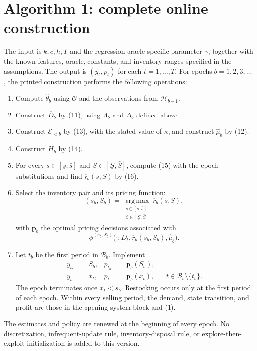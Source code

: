 \documentclass[11pt]{article}
\begin{document}
\section*{Algorithm 1: complete online construction}
The input is \(k,c,h,T\) and the regression-oracle-specific parameter \(\gamma\), together with the known features, oracle, constants, and inventory ranges specified in the assumptions. The output is \((y_t,p_t)\) for each \(t=1,\ldots,T\). For epochs \(b=1,2,3,\ldots\), the printed construction performs the following operations:
\begin{enumerate}
\item Compute \(\widehat\theta_b\) using \(\mathcal O\) and the observations from \(\mathcal H_{b-1}\).
\item Construct \(\overline D_b\) by (11), using \(\Lambda_b\) and \(\Delta_b\) defined above.
\item Construct \(\mathcal E_{<b}\) by (13), with the stated value of \(\kappa\), and construct \(\widehat\mu_b\) by (12).
\item Construct \(\overline H_b\) by (14).
\item For every \(s\in[\underline s,\bar s]\) and \(S\in[\underline S,\bar S]\), compute (15) with the epoch substitutions and find \(\overline r_b(s,S)\) by (16).
\item Select the inventory pair and its pricing function:
\[
(s_b,S_b)=
\operatorname*{arg\,max}_{\substack{s\in[\underline s,\bar s]\\S\in[\underline S,\bar S]}}
\overline r_b(s,S),
\]
with \(\boldsymbol p_b\) the optimal pricing decisions associated with
\[
\phi^{(s_b,S_b)}
\bigl(\cdot;\overline D_b,\overline r_b(s_b,S_b),\widehat\mu_b\bigr).
\]
\item Let \(t_b\) be the first period in \(\mathcal B_b\). Implement
\[
\begin{aligned}
y_{t_b}&=S_b,&p_{t_b}&=\boldsymbol p_b(S_b),\\
y_t&=x_t,&p_t&=\boldsymbol p_b(x_t),
&&t\in\mathcal B_b\setminus\{t_b\}.
\end{aligned}
\]
The epoch terminates once \(x_t<s_b\). Restocking occurs only at the first period of each epoch. Within every selling period, the demand, state transition, and profit are those in the opening system block and (1).
\end{enumerate}
The estimates and policy are renewed at the beginning of every epoch. No discretization, infrequent-update rule, inventory-disposal rule, or explore-then-exploit initialization is added to this version.
\end{document}
